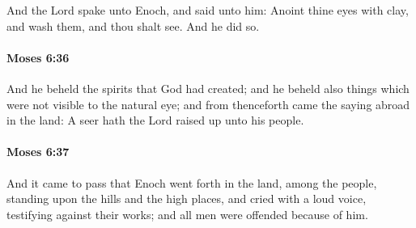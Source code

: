 			And the Lord spake unto Enoch, and said unto him: Anoint thine eyes with clay, and wash them, and thou shalt see. And he did so.


		\paragraph{Moses 6:36} %
			\label{MOSES-6-36}

			And he beheld the spirits that God had created; and he beheld also things which were not visible to the natural eye; and from thenceforth came the saying abroad in the land: A seer hath the Lord raised up unto his people.


		\paragraph{Moses 6:37} %
			\label{MOSES-6-37}

			And it came to pass that Enoch went forth in the land, among the people, standing upon the hills and the high places, and cried with a loud voice, testifying against their works; and all men were offended because of him.


